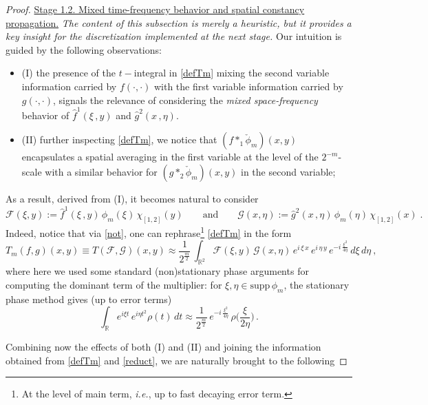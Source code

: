 \documentclass[a4paper,reqno]{amsart}
\numberwithin{equation}{section}
\theoremstyle{definition}
\newcommand{\R}{\mathbb{R}}
\def\F{\mathcal{F}}
\def\G{\mathcal{G}}
\begin{document}
\begin{proof}
\noindent\underline{\textsf{Stage 1.2. Mixed time-frequency behavior and spatial constancy propagation.}} \emph{The content of this subsection is merely a heuristic, but it provides a key insight for the discretization implemented at the next stage.} Our intuition is guided by the following observations:
\begin{itemize}
\item (I) the presence of the $t-$integral in \eqref{defTm} mixing the second variable information carried by $f(\cdot, \cdot)$ with the first variable information carried by $g(\cdot,\cdot)$, signals the relevance of considering the \emph{mixed space-frequency} behavior of $\widehat{f}^1(\xi\,,y)$ and $\widehat{g}^2(x\,,\eta)$.
\item (II) further inspecting \eqref{defTm}, we notice that $(f*_{1}\check{\phi}_m)(x,y)$ encapsulates a spatial averaging in the first variable at the level of the $2^{-m}$-scale  with a similar behavior for $(g*_2\check{\phi}_m)(x,y)$ in the second variable;
\end{itemize}
As a result, derived from (I), it becomes natural to consider
\begin{equation}\label{not}
	\F(\xi,y):=\widehat{f}^1(\xi\,,y)\,\phi_m(\xi)\,\chi_{[1,2]}(y)\qquad\textrm{and}\qquad
	\G(x,\eta):=\widehat{g}^2(x\,,\eta)\,\phi_m(\eta)\,\chi_{[1,2]}(x)\;.
\end{equation}
Indeed, notice that via \eqref{not}, one can rephrase\footnote{At the level of main term, \textit{i.e.}, up to fast decaying error term.} \eqref{defTm} in the form
\begin{equation}\label{reduct}
	T_m(f,g)(x,y)\equiv T(\F,\G)(x,y)\approx \frac{1}{2^{\frac{m}{2}}}\,\int_{\R^2} \F(\xi,y)\,\G(x,\eta)\,e^{i\,\xi\,x}\,e^{i\,\eta\,y}\,e^{-i\,\frac{\xi^2}{4 \eta}}\,d\xi\,d\eta\:,
\end{equation}
where here we used some standard (non)stationary phase arguments for computing the dominant term of the multiplier: for
$\xi,\eta\in \textrm{supp}\,\phi_m$, the stationary phase method gives (up to error terms)
\begin{equation}\label{statphase}
	\int_{\R} e^{i \xi t}\,e^{i \eta t^2}\rho(t)\,dt\approx \frac{1}{2^{\frac{m}{2}}}\,e^{-i\,\frac{\xi^2}{4 \eta}}\,\rho\Big(\frac{\xi}{2 \eta}\Big)\,.
\end{equation}

Combining now the effects of both (I) and (II) and joining the information obtained from \eqref{defTm} and \eqref{reduct}, we are naturally brought to the following
\bigskip


\end{proof}
\end{document}
